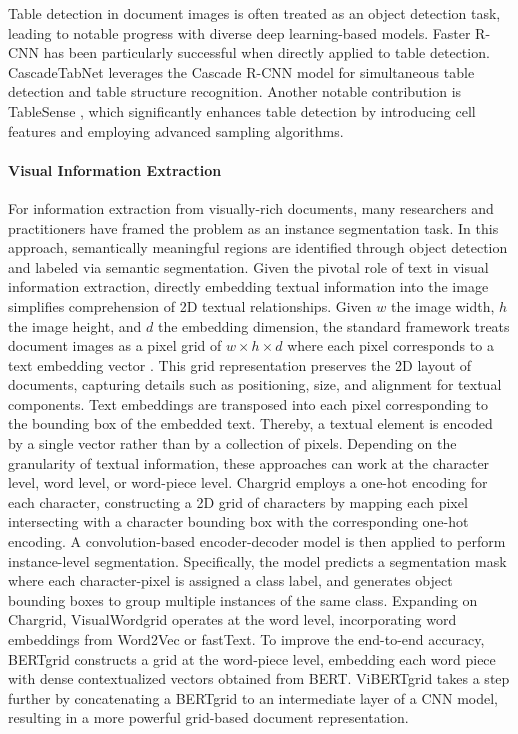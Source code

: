 Table detection in document images is often treated as an object detection task, leading to notable progress with diverse deep learning-based models. Faster R-CNN has been particularly successful when directly applied to table detection. CascadeTabNet \citep{prasad2020cascadetabnet} leverages the Cascade R-CNN \citep{cai2018cascade} model for simultaneous table detection and table structure recognition. Another notable contribution is TableSense \citep{dong2019tablesense}, which significantly enhances table detection by introducing cell features and employing advanced sampling algorithms.


\paragraph{Visual Information Extraction} 

For information extraction from visually-rich documents, many researchers and practitioners have framed the problem as an instance segmentation task. In this approach, semantically meaningful regions are identified through object detection and labeled via semantic segmentation. Given the pivotal role of text in visual information extraction, directly embedding textual information into the image simplifies comprehension of 2D textual relationships. Given $w$ the image width, $h$ the image height, and $d$ the embedding dimension, the standard framework treats document images as a pixel grid of $w \times h \times d$ where each pixel corresponds to a text embedding vector \citep{katti2018chargrid}. This grid representation preserves the 2D layout of documents, capturing details such as positioning, size, and alignment for textual components. Text embeddings are transposed into each pixel corresponding to the bounding box of the embedded text. Thereby, a textual element is encoded by a single vector rather than by a collection of pixels. Depending on the granularity of textual information, these approaches can work at the character level, word level, or word-piece level. Chargrid \citep{katti2018chargrid} employs a one-hot encoding for each character, constructing a 2D grid of characters by mapping each pixel intersecting with a character bounding box with the corresponding one-hot encoding. A convolution-based encoder-decoder model is then applied to perform instance-level segmentation. Specifically, the model predicts a segmentation mask where each character-pixel is assigned a class label, and generates object bounding boxes to group multiple instances of the same class. Expanding on Chargrid, VisualWordgrid \citep{kerroumi2021visualwordgrid} operates at the word level, incorporating word embeddings from Word2Vec or fastText. To improve the end-to-end accuracy, BERTgrid \citep{denk2019bertgrid} constructs a grid at the word-piece level, embedding each word piece with dense contextualized vectors obtained from \ac{BERT}. ViBERTgrid \citep{lin2021vibertgrid} takes a step further by concatenating a BERTgrid to an intermediate layer of a \ac{CNN} model, resulting in a more powerful grid-based document representation. 

